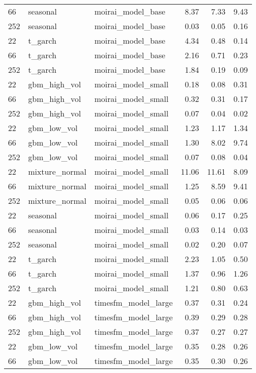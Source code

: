 {\begin{tabular}{lllrrr}
66 & seasonal & moirai\_model\_base & 8.37 & 7.33 & 9.43 \\
252 & seasonal & moirai\_model\_base & 0.03 & 0.05 & 0.16 \\
\midrule
22 & t\_garch & moirai\_model\_base & 4.34 & 0.48 & 0.14 \\
66 & t\_garch & moirai\_model\_base & 2.16 & 0.71 & 0.23 \\
252 & t\_garch & moirai\_model\_base & 1.84 & 0.19 & 0.09 \\
\midrule
22 & gbm\_high\_vol & moirai\_model\_small & 0.18 & 0.08 & 0.31 \\
66 & gbm\_high\_vol & moirai\_model\_small & 0.32 & 0.31 & 0.17 \\
252 & gbm\_high\_vol & moirai\_model\_small & 0.07 & 0.04 & 0.02 \\
\midrule
22 & gbm\_low\_vol & moirai\_model\_small & 1.23 & 1.17 & 1.34 \\
66 & gbm\_low\_vol & moirai\_model\_small & 1.30 & 8.02 & 9.74 \\
252 & gbm\_low\_vol & moirai\_model\_small & 0.07 & 0.08 & 0.04 \\
\midrule
22 & mixture\_normal & moirai\_model\_small & 11.06 & 11.61 & 8.09 \\
66 & mixture\_normal & moirai\_model\_small & 1.25 & 8.59 & 9.41 \\
252 & mixture\_normal & moirai\_model\_small & 0.05 & 0.06 & 0.06 \\
\midrule
22 & seasonal & moirai\_model\_small & 0.06 & 0.17 & 0.25 \\
66 & seasonal & moirai\_model\_small & 0.03 & 0.14 & 0.03 \\
252 & seasonal & moirai\_model\_small & 0.02 & 0.20 & 0.07 \\
\midrule
22 & t\_garch & moirai\_model\_small & 2.23 & 1.05 & 0.50 \\
66 & t\_garch & moirai\_model\_small & 1.37 & 0.96 & 1.26 \\
252 & t\_garch & moirai\_model\_small & 1.21 & 0.80 & 0.63 \\
\midrule
22 & gbm\_high\_vol & timesfm\_model\_large & 0.37 & 0.31 & 0.24 \\
66 & gbm\_high\_vol & timesfm\_model\_large & 0.39 & 0.29 & 0.28 \\
252 & gbm\_high\_vol & timesfm\_model\_large & 0.37 & 0.27 & 0.27 \\
\midrule
22 & gbm\_low\_vol & timesfm\_model\_large & 0.35 & 0.28 & 0.26 \\
66 & gbm\_low\_vol & timesfm\_model\_large & 0.35 & 0.30 & 0.26 \\

\end{tabular}}
